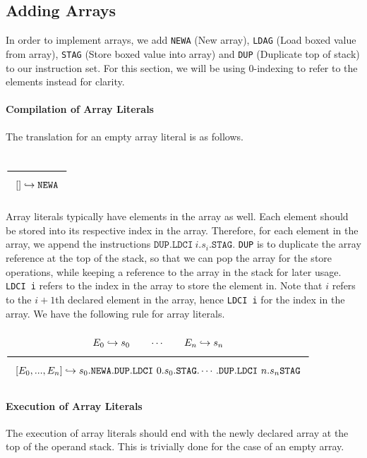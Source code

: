 
\newcommand{\qed}{$\Box$}
\newcommand{\Rule}[2]{\genfrac{}{}{0.7pt}{}{{\setlength{\fboxrule}{0pt}\setlength{\fboxsep}{3mm}\fbox{$#1$}}}{{\setlength{\fboxrule}{0pt}\setlength{\fboxsep}{3mm}\fbox{$#2$}}}}
\newcommand{\Rulee}[3]{\genfrac{}{}{0.7pt}{}{{\setlength{\fboxrule}{0pt}\setlength{\fboxsep}{3mm}\fbox{$#1$}}}{{\setlength{\fboxrule}{0pt}\setlength{\fboxsep}{3mm}\fbox{$#2$}}}[#3]}
\newcommand{\transition}{\rightrightarrows_s}
\newcommand{\translate}{\twoheadrightarrow}
\newcommand{\translateaux}{\hookrightarrow}

\subsection{Adding Arrays}

In order to implement arrays, we add \texttt{NEWA} (New array),
\texttt{LDAG} (Load boxed value from array),
\texttt{STAG} (Store boxed value into array) and \texttt{DUP}
(Duplicate top of stack) to our instruction set. For this section,
we will be using 0-indexing to refer to the elements instead for clarity.

\paragraph{Compilation of Array Literals}
The translation for an empty array literal is as follows.

$\Rule{}{\lbrack\rbrack \translateaux \texttt{NEWA}}$

Array literals typically have elements in the array as well.
Each element should be stored into its respective index in the array.
Therefore, for each element in the array, we append the instructions
$\texttt{DUP}.\texttt{LDCI}\ i.s_i.\texttt{STAG}$.
\texttt{DUP} is to duplicate the
array reference at the top of the stack, so that we can pop the array
for the store operations, while keeping a reference to the array in
the stack for later usage. \texttt{LDCI i} refers to the index in the array
to store the element in. Note that $i$ refers to the $i+1$th declared element
in the array, hence \texttt{LDCI i} for the index in the array.
We have the following rule for array literals.

$\Rule{E_0 \translateaux s_0 \qquad \cdots \qquad E_n \translateaux s_n}{
\lbrack E_0, ..., E_n\rbrack \translateaux s_0. \texttt{NEWA}.\texttt{DUP}
.\texttt{LDCI}\ 0.s_0.\texttt{STAG}. \cdots .\texttt{DUP}
.\texttt{LDCI}\ n.s_n\texttt{STAG}}
$

\paragraph{Execution of Array Literals}
The execution of array literals should end with the newly declared
array at the top of the operand stack. This is trivially done for the
case of an empty array.

